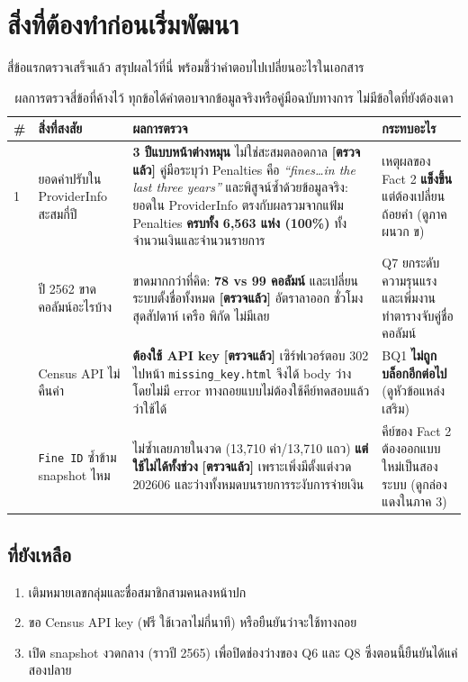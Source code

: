 \documentclass[11pt,a4paper]{article}
\newcommand{\sansall}{\sffamily}
\newcommand{\code}[1]{\texttt{#1}}
\newcommand{\ok}{\textcolor{dw}{\textbf{[ตรวจแล้ว]}}}
\begin{document}
\section{สิ่งที่ต้องทำก่อนเริ่มพัฒนา}

สี่ข้อแรกตรวจเสร็จแล้ว สรุปผลไว้ที่นี่ พร้อมชี้ว่าคำตอบไปเปลี่ยนอะไรในเอกสาร

\begin{table}[H]\centering
\begin{adjustbox}{max width=\linewidth}
\small
\begin{tabular}{L{0.6cm} L{4.6cm} L{6.6cm} L{4.6cm}}
\toprule
\sansall\bfseries \# & \sansall\bfseries สิ่งที่สงสัย &
\sansall\bfseries ผลการตรวจ & \sansall\bfseries กระทบอะไร \\
 & ยอดค่าปรับใน ProviderInfo สะสมกี่ปี &
  \textbf{3 ปีแบบหน้าต่างหมุน} ไม่ใช่สะสมตลอดกาล \ok{}
  คู่มือระบุว่า Penalties คือ \emph{``fines\ldots in the last three years''}
  และพิสูจน์ซ้ำด้วยข้อมูลจริง: ยอดใน ProviderInfo ตรงกับผลรวมจากแฟ้ม Penalties
  \textbf{ครบทั้ง 6{,}563 แห่ง (100\%)} ทั้งจำนวนเงินและจำนวนรายการ &
  เหตุผลของ Fact 2 \textbf{แข็งขึ้น} แต่ต้องเปลี่ยนถ้อยคำ (ดูภาคผนวก ข) \\
 & ปี 2562 ขาดคอลัมน์อะไรบ้าง &
  ขาดมากกว่าที่คิด: \textbf{78 vs 99 คอลัมน์} และเปลี่ยนระบบตั้งชื่อทั้งหมด
  \ok{} อัตราลาออก ชั่วโมงสุดสัปดาห์ เครือ พิกัด ไม่มีเลย &
  Q7 ยกระดับความรุนแรง และเพิ่มงานทำตารางจับคู่ชื่อคอลัมน์ \\
 & Census API ไม่คืนค่า &
  \textbf{ต้องใช้ API key} \ok{} เซิร์ฟเวอร์ตอบ 302 ไปหน้า
  \code{missing_key.html} จึงได้ body ว่างโดยไม่มี error
  ทางถอยแบบไม่ต้องใช้คีย์ทดสอบแล้วว่าใช้ได้ &
  BQ1 \textbf{ไม่ถูกบล็อกอีกต่อไป} (ดูหัวข้อแหล่งเสริม) \\
 & \code{Fine ID} ซ้ำข้าม snapshot ไหม &
  ไม่ซ้ำเลยภายในงวด (13{,}710 ค่า/13{,}710 แถว) \textbf{แต่ใช้ไม่ได้ทั้งช่วง}
  \ok{} เพราะเพิ่งมีตั้งแต่งวด 202606 และว่างทั้งหมดบนรายการระงับการจ่ายเงิน &
  คีย์ของ Fact 2 ต้องออกแบบใหม่เป็นสองระบบ (ดูกล่องแดงในภาค 3) \\
\bottomrule
\end{tabular}
\end{adjustbox}
\caption{ผลการตรวจสี่ข้อที่ค้างไว้ ทุกข้อได้คำตอบจากข้อมูลจริงหรือคู่มือฉบับทางการ ไม่มีข้อใดที่ยังต้องเดา}
\end{table}

\subsection*{ที่ยังเหลือ}
\begin{enumerate}
\item เติมหมายเลขกลุ่มและชื่อสมาชิกสามคนลงหน้าปก
\item ขอ Census API key (ฟรี ใช้เวลาไม่กี่นาที) หรือยืนยันว่าจะใช้ทางถอย
\item เปิด snapshot งวดกลาง (ราวปี 2565) เพื่อปิดช่องว่างของ Q6 และ Q8
      ซึ่งตอนนี้ยืนยันได้แค่สองปลาย
\end{enumerate}
\end{document}
